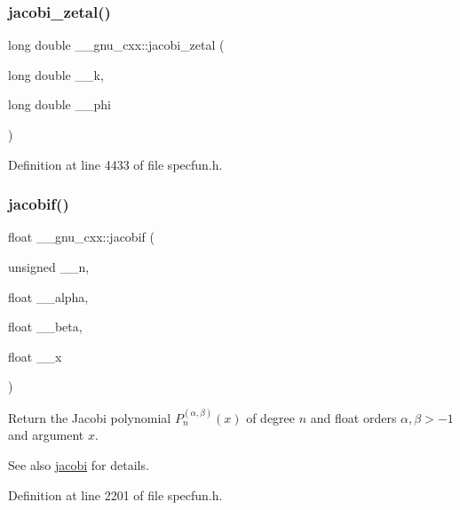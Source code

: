\subsubsection{\texorpdfstring{jacobi\+\_\+zetal()}{jacobi\_zetal()}}
{\footnotesize\ttfamily long double \+\_\+\+\_\+gnu\+\_\+cxx\+::jacobi\+\_\+zetal (\begin{DoxyParamCaption}\item[{long double}]{\+\_\+\+\_\+k,  }\item[{long double}]{\+\_\+\+\_\+phi }\end{DoxyParamCaption})\hspace{0.3cm}{\ttfamily [inline]}}



Definition at line 4433 of file specfun.\+h.

\mbox{\label{group__gnu__math__spec__func_ga450db12e06d6993d169afab5b3f6d0b8}} 
\subsubsection{\texorpdfstring{jacobif()}{jacobif()}}
{\footnotesize\ttfamily float \+\_\+\+\_\+gnu\+\_\+cxx\+::jacobif (\begin{DoxyParamCaption}\item[{unsigned}]{\+\_\+\+\_\+n,  }\item[{float}]{\+\_\+\+\_\+alpha,  }\item[{float}]{\+\_\+\+\_\+beta,  }\item[{float}]{\+\_\+\+\_\+x }\end{DoxyParamCaption})\hspace{0.3cm}{\ttfamily [inline]}}

Return the Jacobi polynomial $ P_n^{(\alpha,\beta)}(x) $ of degree $ n $ and {\ttfamily float} orders $ \alpha, \beta > -1 $ and argument $ x $.

\begin{DoxySeeAlso}{See also}
\hyperlink{group__gnu__math__spec__func_gad54f6601748324d268532138eb38ca33}{jacobi} for details. 
\end{DoxySeeAlso}


Definition at line 2201 of file specfun.\+h.



